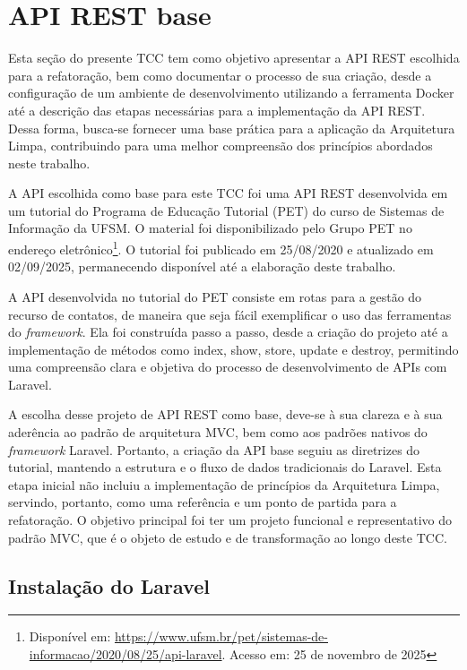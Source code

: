 \section {API REST base}

    \par Esta seção do presente TCC tem como objetivo apresentar a API REST escolhida para a refatoração, bem como documentar o processo de sua criação, desde a configuração de um ambiente de desenvolvimento utilizando a ferramenta Docker até a descrição das etapas necessárias para a implementação da API REST. Dessa forma, busca-se fornecer uma base prática para a aplicação da Arquitetura Limpa, contribuindo para uma melhor compreensão dos princípios abordados neste trabalho.
    
    \par A API escolhida como base para este TCC foi uma API REST desenvolvida em um tutorial do Programa de Educação Tutorial (PET) do curso de Sistemas de Informação da UFSM. O material foi disponibilizado pelo Grupo PET no endereço eletrônico\footnote{Disponível em: \url{https://www.ufsm.br/pet/sistemas-de-informacao/2020/08/25/api-laravel}. Acesso em: 25 de novembro de 2025}. O tutorial foi publicado em 25/08/2020 e atualizado em 02/09/2025, permanecendo disponível até a elaboração deste trabalho.

    \par A API desenvolvida no tutorial do PET consiste em rotas para a gestão do recurso de contatos, de maneira que seja fácil exemplificar o uso das ferramentas do \textit{framework}. Ela foi construída passo a passo, desde a criação do projeto até a implementação de métodos como index, show, store, update e destroy, permitindo uma compreensão clara e objetiva do processo de desenvolvimento de APIs com Laravel.
    
    \par A escolha desse projeto de API REST como base, deve-se à sua clareza e à sua aderência ao padrão de arquitetura MVC, bem como aos padrões nativos do \textit{framework} Laravel. Portanto, a criação da API base seguiu as diretrizes do tutorial, mantendo a estrutura e o fluxo de dados tradicionais do Laravel. Esta etapa inicial não incluiu a implementação de princípios da Arquitetura Limpa, servindo, portanto, como uma referência e um ponto de partida para a refatoração. O objetivo principal foi ter um projeto funcional e representativo do padrão MVC, que é o objeto de estudo e de transformação ao longo deste TCC.

    \subsection{Instalação do Laravel}
    
